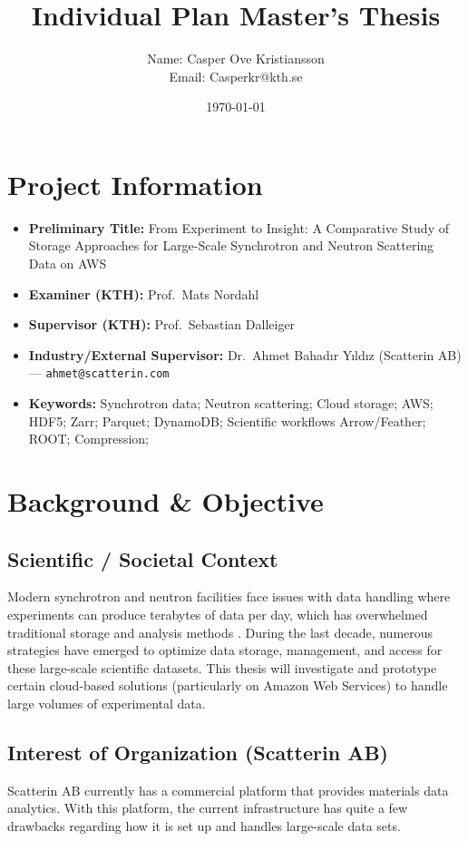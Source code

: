 \documentclass{article}
\title{Individual Plan Master's Thesis}
\author{Name: Casper Ove Kristiansson\\Email: Casperkr@kth.se}
\date{\today}
\begin{document}
\setlength\parindent{0pt}
\maketitle

\section{Project Information}
\begin{itemize}
  \item \textbf{Preliminary Title:} From Experiment to Insight: A Comparative Study of Storage Approaches for Large-Scale Synchrotron and Neutron Scattering Data on AWS
  \item \textbf{Examiner (KTH):} Prof.\ Mats Nordahl
  \item \textbf{Supervisor (KTH):} Prof.\ Sebastian Dalleiger
  \item \textbf{Industry/External Supervisor:} Dr.\ Ahmet Bahadır Yıldız (Scatterin AB) — \texttt{ahmet@scatterin.com}
  \item \textbf{Keywords:} Synchrotron data; Neutron scattering; Cloud storage; AWS; HDF5; Zarr; Parquet;  DynamoDB;  Scientific workflows Arrow/Feather; ROOT; Compression;
\end{itemize}




\section{Background \& Objective}
\subsection{Scientific / Societal Context}
Modern synchrotron and neutron facilities face issues with data handling where experiments can produce terabytes of data per day, which has overwhelmed traditional storage and analysis methods \cite{wang2018synchrotron}. During the last decade, numerous strategies have emerged to optimize data storage, management, and access for these large-scale scientific datasets. This thesis will investigate and prototype certain cloud-based solutions (particularly on Amazon Web Services) to handle large volumes of experimental data.

\subsection{Interest of Organization (Scatterin AB)}
Scatterin AB currently has a commercial platform that provides materials data analytics. With this platform, the current infrastructure has quite a few drawbacks regarding how it is set up and handles large-scale data sets.
\end{document}
